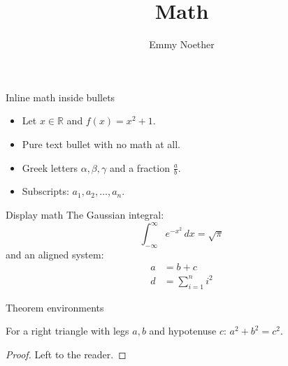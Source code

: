 \documentclass{beamer}
\title{Math}
\author{Emmy Noether}
\date{}
\begin{document}
\begin{frame}{Inline math inside bullets}
  \begin{itemize}
    \item Let $x \in \mathbb{R}$ and $f(x) = x^2 + 1$.
    \item Pure text bullet with no math at all.
    \item Greek letters $\alpha, \beta, \gamma$ and a fraction $\frac{a}{b}$.
    \item Subscripts: $a_1, a_2, \ldots, a_n$.
  \end{itemize}
\end{frame}

\begin{frame}{Display math}
  The Gaussian integral:
  \[
    \int_{-\infty}^{\infty} e^{-x^2}\,dx = \sqrt{\pi}
  \]
  and an aligned system:
  \begin{align}
    a &= b + c \\
    d &= \sum_{i=1}^{n} i^2
  \end{align}
\end{frame}

\begin{frame}{Theorem environments}
  \begin{theorem}[Pythagoras]
    For a right triangle with legs $a, b$ and hypotenuse $c$: $a^2 + b^2 = c^2$.
  \end{theorem}
  \begin{proof}
    Left to the reader.
  \end{proof}
\end{frame}
\end{document}

